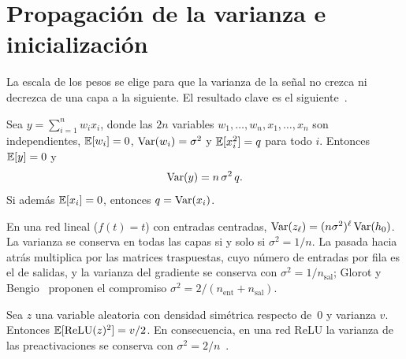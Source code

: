 \section{Propagación de la varianza e inicialización}

La escala de los pesos se elige para que la varianza de la señal no crezca ni decrezca de una capa a la siguiente. El resultado clave es el siguiente~\cite[§5.4.2]{d2l}.

\begin{teorema}\label{teo:varianza}
Sea $y=\sum_{i=1}^{n}w_ix_i$, donde las $2n$ variables $w_1,\dots,w_n,x_1,\dots,x_n$ son independientes, $\mathbb{E}[w_i]=0$, $\operatorname{Var}(w_i)=\sigma^{2}$ y $\mathbb{E}[x_i^{2}]=q$ para todo $i$. Entonces $\mathbb{E}[y]=0$ y
\[
\operatorname{Var}(y)=n\,\sigma^{2}\,q .
\]
Si además $\mathbb{E}[x_i]=0$, entonces $q=\operatorname{Var}(x_i)$.
\end{teorema}

\begin{corolario}\label{cor:xavier}
En una red lineal ($f(t)=t$) con entradas centradas, $\operatorname{Var}(z_\ell)=(n\sigma^{2})^{\ell}\operatorname{Var}(h_0)$. La varianza se conserva en todas las capas si y solo si $\sigma^{2}=1/n$. La pasada hacia atrás multiplica por las matrices traspuestas, cuyo número de entradas por fila es el de salidas, y la varianza del gradiente se conserva con $\sigma^{2}=1/n_{\text{sal}}$; Glorot y Bengio~\cite{glorot} proponen el compromiso $\sigma^{2}=2/(n_{\text{ent}}+n_{\text{sal}})$.
\end{corolario}

\begin{proposicion}[Inicialización de He]\label{prop:he}
Sea $z$ una variable aleatoria con densidad simétrica respecto de~0 y varianza $v$. Entonces $\mathbb{E}[\operatorname{ReLU}(z)^{2}]=v/2$. En consecuencia, en una red ReLU la varianza de las preactivaciones se conserva con $\sigma^{2}=2/n$~\cite{he-init}.
\end{proposicion}

\addtocounter{definicion}{1}%

\addtocounter{definicion}{1}%

